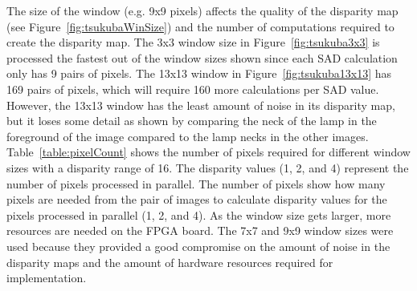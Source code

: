 The size of the window (e.g. 9x9 pixels) affects the quality of the disparity map (see Figure~\ref{fig:tsukubaWinSize}) and the number of computations required to create the disparity map. The 3x3 window size in Figure~\ref{fig:tsukuba3x3} is processed the fastest out of the window sizes shown since each SAD calculation only has 9 pairs of pixels. The 13x13 window in Figure~\ref{fig:tsukuba13x13} has 169 pairs of pixels, which will require 160 more calculations per SAD value. However, the 13x13 window has the least amount of noise in its disparity map, but it loses some detail as shown by comparing the neck of the lamp in the foreground of the image compared to the lamp necks in the other images. Table~\ref{table:pixelCount} shows the number of pixels required for different window sizes with a disparity range of 16. The disparity values (1, 2, and 4) represent the number of pixels processed in parallel. The number of pixels show how many pixels are needed from the pair of images to calculate disparity values for the pixels processed in parallel (1, 2, and 4). As the window size gets larger, more resources are needed on the FPGA board. The 7x7 and 9x9 window sizes were used because they provided a good compromise on the amount of noise in the disparity maps and the amount of hardware resources required for implementation.

